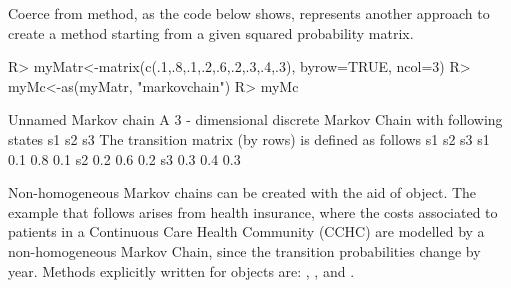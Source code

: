 \documentclass[nojss]{jss}
\begin{document}
Coerce from  method, as the code below shows, represents another approach to create a  method starting from a given squared probability matrix.

\begin{Schunk}
\begin{Sinput}
R> myMatr<-matrix(c(.1,.8,.1,.2,.6,.2,.3,.4,.3), byrow=TRUE, ncol=3)
R> myMc<-as(myMatr, "markovchain")
R> myMc
\end{Sinput}
\begin{Soutput}
Unnamed Markov chain 
 A  3 - dimensional discrete Markov Chain with following states 
 s1 s2 s3 
 The transition matrix   (by rows)  is defined as follows 
    s1  s2  s3
s1 0.1 0.8 0.1
s2 0.2 0.6 0.2
s3 0.3 0.4 0.3
\end{Soutput}
\end{Schunk}


Non-homogeneous Markov chains can be created with the aid of  object. The example that follows arises from health insurance, where the costs associated to patients in a Continuous Care Health Community (CCHC) are modelled by a non-homogeneous Markov Chain, since the 
transition probabilities change by year. Methods explicitly written for
 objects are: , ,   and
\code{[}.
\end{document}
